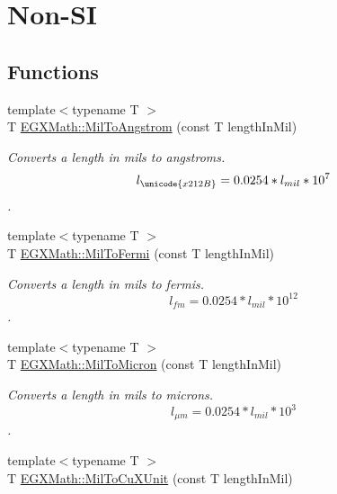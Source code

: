 \hypertarget{group___e_g_x_math-_conversions-_length_conversions-_imperial-_mil-_non-_s_i}{}\section{Non-\/\+SI}
\label{group___e_g_x_math-_conversions-_length_conversions-_imperial-_mil-_non-_s_i}
\subsection*{Functions}
\begin{DoxyCompactItemize}
\item 
{\footnotesize template$<$typename T $>$ }\\T \mbox{\hyperlink{group___e_g_x_math-_conversions-_length_conversions-_imperial-_mil-_non-_s_i_gad209d1b047ce810b8879b9ea1ff4a5a5}{E\+G\+X\+Math\+::\+Mil\+To\+Angstrom}} (const T length\+In\+Mil)
\begin{DoxyCompactList}\small\item\em Converts a length in mils to angstroms. \[ l_{\unicode{x212B}}=0.0254 * l_{mil} * 10^{7} \]. \end{DoxyCompactList}\item 
{\footnotesize template$<$typename T $>$ }\\T \mbox{\hyperlink{group___e_g_x_math-_conversions-_length_conversions-_imperial-_mil-_non-_s_i_ga713363db9840eea0ed836b1d47cc0b6c}{E\+G\+X\+Math\+::\+Mil\+To\+Fermi}} (const T length\+In\+Mil)
\begin{DoxyCompactList}\small\item\em Converts a length in mils to fermis. \[ l_{fm}=0.0254 * l_{mil} * 10^{12} \]. \end{DoxyCompactList}\item 
{\footnotesize template$<$typename T $>$ }\\T \mbox{\hyperlink{group___e_g_x_math-_conversions-_length_conversions-_imperial-_mil-_non-_s_i_gab38b772b1b070729756dcdc87826f5d0}{E\+G\+X\+Math\+::\+Mil\+To\+Micron}} (const T length\+In\+Mil)
\begin{DoxyCompactList}\small\item\em Converts a length in mils to microns. \[ l_{\mu m}=0.0254 * l_{mil} * 10^{3} \]. \end{DoxyCompactList}\item 
{\footnotesize template$<$typename T $>$ }\\T \mbox{\hyperlink{group___e_g_x_math-_conversions-_length_conversions-_imperial-_mil-_non-_s_i_ga92f713e3dddc0a45caa3fc6b5e8ca442}{E\+G\+X\+Math\+::\+Mil\+To\+Cu\+X\+Unit}} (const T length\+In\+Mil)

\end{DoxyCompactItemize}
